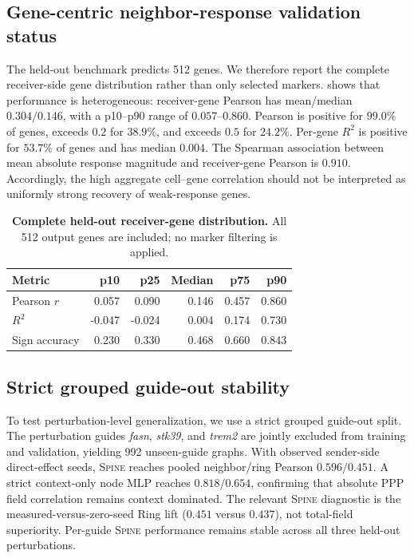 \documentclass[sigconf,review,balance=false]{acmart}
\newcommand{\methodname}{\textsc{Spine}\xspace}
\begin{document}
\subsection{Gene-centric neighbor-response validation status}
\label{app:full_gene_centric_validation}

The held-out benchmark predicts 512 genes. We therefore report the complete
receiver-side gene distribution rather than only selected markers.
 shows that performance is heterogeneous:
receiver-gene Pearson has mean/median $0.304/0.146$, with a p10--p90 range of
$0.057$--$0.860$. Pearson is positive for $99.0\%$ of genes, exceeds $0.2$ for
$38.9\%$, and exceeds $0.5$ for $24.2\%$. Per-gene $R^2$ is positive for
$53.7\%$ of genes and has median $0.004$. The Spearman association between
mean absolute response magnitude and receiver-gene Pearson is $0.910$.
Accordingly, the high aggregate cell--gene correlation should not be
interpreted as uniformly strong recovery of weak-response genes.

\begin{table}[t]
\centering
\footnotesize
\setlength{\tabcolsep}{5pt}
\renewcommand{\arraystretch}{1.04}
\caption{\textbf{Complete held-out receiver-gene distribution.}
All 512 output genes are included; no marker filtering is applied.}
\label{tab:app_full_gene_distribution}
\begin{tabular}{lrrrrr}
\toprule
\textbf{Metric} & \textbf{p10} & \textbf{p25} & \textbf{Median} & \textbf{p75} & \textbf{p90} \\
\midrule
Pearson $r$ & 0.057 & 0.090 & 0.146 & 0.457 & 0.860 \\
$R^2$ & -0.047 & -0.024 & 0.004 & 0.174 & 0.730 \\
Sign accuracy & 0.230 & 0.330 & 0.468 & 0.660 & 0.843 \\
\bottomrule
\end{tabular}
\end{table}

\subsection{Strict grouped guide-out stability}
\label{sec:guide_stratified_stability}

To test perturbation-level generalization, we use a strict grouped guide-out
split. The perturbation guides \textit{fasn}, \textit{stk39}, and
\textit{trem2} are jointly excluded from training and validation, yielding 992
unseen-guide graphs. With observed sender-side direct-effect seeds,
\methodname{} reaches pooled neighbor/ring Pearson $0.596/0.451$. A strict
context-only node MLP reaches $0.818/0.654$, confirming that absolute PPP field
correlation remains context dominated. The relevant \methodname{} diagnostic is
the measured-versus-zero-seed Ring lift ($0.451$ versus $0.437$), not
total-field superiority. Per-guide \methodname{} performance remains stable
across all three held-out perturbations.
\end{document}
